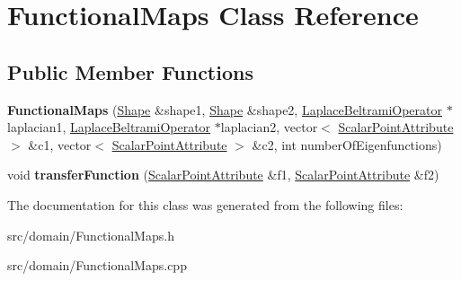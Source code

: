 \hypertarget{class_functional_maps}{}\section{Functional\+Maps Class Reference}
\label{class_functional_maps}
\subsection*{Public Member Functions}
\begin{DoxyCompactItemize}
\item 
\hypertarget{class_functional_maps_ab1c62d698fff079b47e51d362ff30bbc}{}{\bfseries Functional\+Maps} (\hyperlink{class_shape}{Shape} \&shape1, \hyperlink{class_shape}{Shape} \&shape2, \hyperlink{class_laplace_beltrami_operator}{Laplace\+Beltrami\+Operator} $\ast$laplacian1, \hyperlink{class_laplace_beltrami_operator}{Laplace\+Beltrami\+Operator} $\ast$laplacian2, vector$<$ \hyperlink{class_scalar_point_attribute}{Scalar\+Point\+Attribute} $>$ \&c1, vector$<$ \hyperlink{class_scalar_point_attribute}{Scalar\+Point\+Attribute} $>$ \&c2, int number\+Of\+Eigenfunctions)\label{class_functional_maps_ab1c62d698fff079b47e51d362ff30bbc}

\item 
\hypertarget{class_functional_maps_ac5575986be9c4b00a497953e65084f4a}{}void {\bfseries transfer\+Function} (\hyperlink{class_scalar_point_attribute}{Scalar\+Point\+Attribute} \&f1, \hyperlink{class_scalar_point_attribute}{Scalar\+Point\+Attribute} \&f2)\label{class_functional_maps_ac5575986be9c4b00a497953e65084f4a}

\end{DoxyCompactItemize}


The documentation for this class was generated from the following files\+:\begin{DoxyCompactItemize}
\item 
src/domain/Functional\+Maps.\+h\item 
src/domain/Functional\+Maps.\+cpp\end{DoxyCompactItemize}
